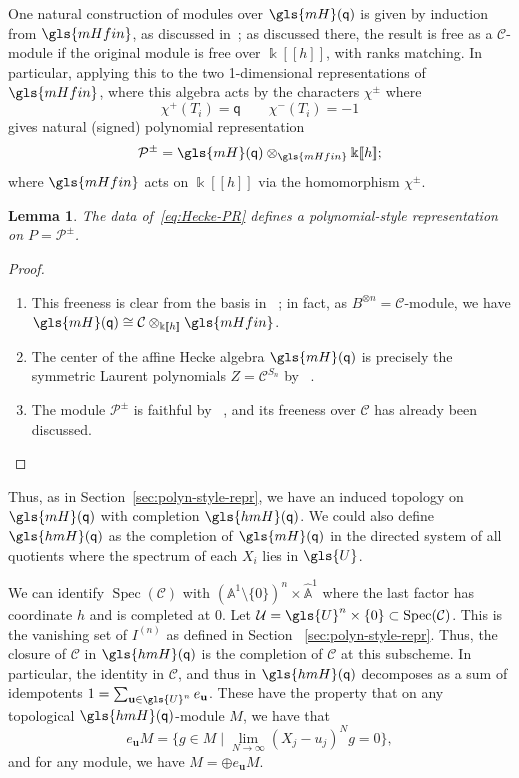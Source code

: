 \documentclass[10pt]{article}
\newtheorem{lemma}[theorem]{Lemma}
\theoremstyle{definition}
\DeclareMathOperator{\Spec}{Spec}
\newcommand{\pq}{\mathsf{q}}
\newcommand{\K}{\Bbbk}%
\newcommand{\Bu}{\mathbf{u}}
\newcommand{\cP}{\mathcal{P}}
\newcommand{\mH}{\gls{mH}}
\newcommand{\hmH}{\gls{hmH}}
\newcommand\llbracket{[\![}
\newcommand\rrbracket{]\!]}
\begin{document}
One natural construction of modules over $\gls{mH}(\pq)$ is given by
induction from $\gls{mHfin} $, as discussed in~\cite[\S~4.3]{MacHecke}; as discussed there, the result is free as a
$\mathcal{C}$-module if the original module is free over $\K\llbracket h\rrbracket $,
with ranks matching. In particular, applying this to the two 1-dimensional
representations of $\gls{mHfin}$, where this algebra acts by the
characters $\chi^\pm$ where
\[ \chi^+(T_i)=\pq\qquad \chi^-(T_i)=-1\] gives natural (signed) polynomial
representation \[\cP^\pm=\gls{mH}(\pq)\otimes_{\gls{mHfin}}\K\llbracket h\rrbracket ;\] where
$\gls{mHfin}$ acts on $\K\llbracket h\rrbracket $ via the homomorphism $\chi^\pm$.
\begin{lemma}
 The data of~\eqref{eq:Hecke-PR} defines a polynomial-style
 representation on $P=\cP^{\pm}$. 
\end{lemma}
\begin{proof}\mbox{}
 \begin{enumerate}
 \item This freeness is clear from the basis in
~\cite[4.3]{MacBourbaki}; in fact, as
 $B^{\otimes n}=\mathcal{C}$-module, we have
 $\gls{mH}(\pq)\cong \mathcal{C}\otimes_{\K\llbracket h\rrbracket }\gls{mHfin} $. 
 \item The center of the affine Hecke algebra $\gls{mH}(\pq)$ is precisely
 the symmetric Laurent polynomials $Z=\mathcal{C}^{S_n}$ by
~\cite[4.5]{MacBourbaki}.
 \item The module $\cP^{\pm}$ is faithful by
~\cite[(4.3.10)]{MacHecke}, and its freeness over $\mathcal{C}$
 has already been discussed.\qedhere
 \end{enumerate}
\end{proof}


Thus, as in Section~\ref{sec:polyn-style-repr}, we have an induced
topology on $\mH(\pq)$ with completion $\hmH(\pq)$. We could also
define $\hmH(\pq)$ as the completion of
$\gls{mH}(\pq)$ in the directed system of all quotients where the spectrum of
each $X_i$ lies in $\gls{U}$. 

We can
identify $\Spec(\mathcal{C})$ with $(\mathbb{A}^1\setminus
\{0\})^n\times \widehat{\mathbb{A}}^1$ where the last factor has coordinate
$h$ and is completed at $0$. 
 Let $\mathcal{U}=\gls{U}^n\times \{0\}\subset \Spec(\mathcal{C})$. This
 is the vanishing set of $I^{(n)}$ as defined in Section
~\ref{sec:polyn-style-repr}. Thus, the closure of $\mathcal{C}$ in
 $\hmH(\pq)$ is the completion of $\mathcal{C}$ at this subscheme. In
 particular, the identity in $\mathcal{C}$, and thus in $\hmH(\pq)$
 decomposes as a sum of idempotents $1=\sum_{\Bu\in \gls{U}^n}e_{\Bu}$. These have the
 property that on any topological $\hmH(\pq)$-module $M$, we have that 
\[e_{\Bu}M=\{ g\in M \mid\lim_{N\to \infty}
 (X_j-{u_j})^Ng=0\},\]
and for any module, we have $M=\oplus e_{\Bu}M$. 
\end{document}

